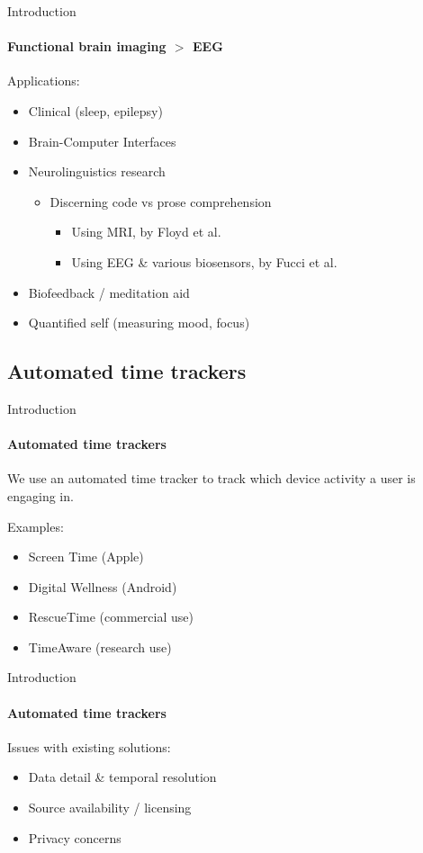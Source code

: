 \documentclass[xcolor={dvipsnames,table},12pt]{beamer}
\begin{document}
\begin{frame}{Introduction}
    \framesubtitle{Functional brain imaging $>$ EEG}

    Applications:

    \begin{itemize}
        \item Clinical (sleep, epilepsy)
        \item Brain-Computer Interfaces
        \item Neurolinguistics research
        \begin{itemize}
            \item Discerning code vs prose comprehension
                \begin{itemize}
                    \item Using MRI, by Floyd et al.~\cite{floyd_decoding_2017}
                    \item Using EEG \& various biosensors, by Fucci et al.~\cite{fucci_replication_2019}
                \end{itemize}
        \end{itemize}
        \item Biofeedback / meditation aid
        \item Quantified self (measuring mood, focus)
    \end{itemize}
\end{frame}

\subsection{Automated time trackers}
\begin{frame}{Introduction}
    \framesubtitle{Automated time trackers}

    We use an automated time tracker to track which device activity a user is engaging in.

    Examples:
    \begin{itemize}
        \item Screen Time (Apple)
        \item Digital Wellness (Android)
        \item RescueTime (commercial use)
        \item TimeAware (research use)
    \end{itemize}
\end{frame}


\begin{frame}{Introduction}
    \framesubtitle{Automated time trackers}

    Issues with existing solutions:
    \begin{itemize}
        \item Data detail \& temporal resolution
        \item Source availability / licensing
        \item Privacy concerns
    \end{itemize}
\end{frame}
\end{document}
